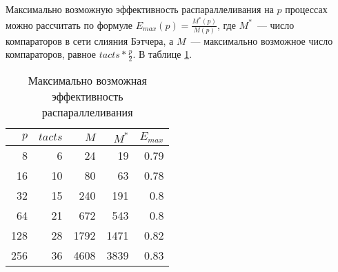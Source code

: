 \documentclass[oneside,final,14pt]{extreport}
\begin{document}
Максимально возможную эффективность распараллеливания на $p$ процессах
можно рассчитать по формуле $E_{max}(p) = \frac{M^*(p)}{M(p)}$,
где $M^*$~--- число компараторов в сети слияния Бэтчера,
а $M$~--- максимально возможное число компараторов, равное $tacts*\frac{p}{2}$.
В таблице \ref{max_eff_tab}.

\begin{table}[hp]
\centering
\begin{tabular}{|r|r|r|r|r|}\hline
$p$ & $tacts$ & $M$ & $M^*$ & $E_{max}$ \\ \hline
8   & 6       & 24  & 19    & 0.79      \\ \hline
16  & 10      & 80  & 63    & 0.78      \\ \hline
32  & 15      & 240 & 191   & 0.8       \\ \hline
64  & 21      & 672 & 543   & 0.8       \\ \hline
128 & 28      & 1792& 1471  & 0.82      \\ \hline
256 & 36      & 4608& 3839  & 0.83      \\ \hline
\end{tabular}
\caption{Максимально возможная эффективность распараллеливания}
\label{max_eff_tab}
\end{table}

\newpage
\appendix
\end{document}
